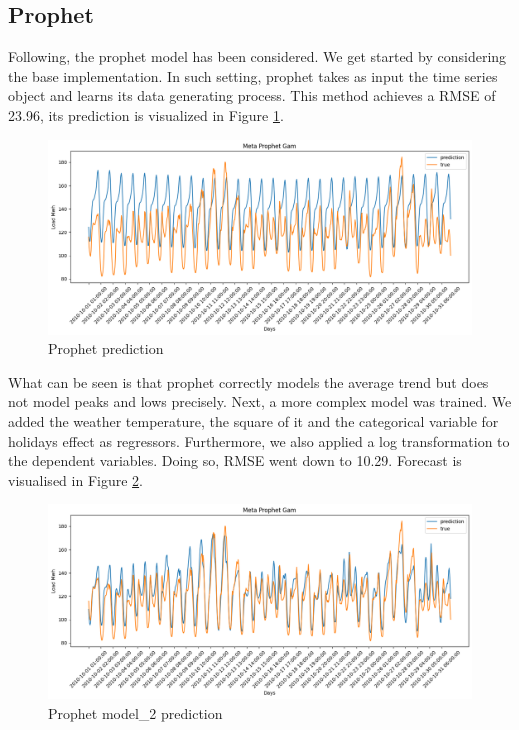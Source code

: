 \subsection{Prophet}
Following, the prophet model has been considered. 
We get started by considering the base implementation. In such setting, prophet takes as input the time series object and learns its data generating process.
This method achieves a RMSE of 23.96, its prediction is visualized in Figure \ref{fig:prophet_price_1}.
\begin{figure}[!h]
    \includegraphics[width=\textwidth]{images/prophet_price_1.png}
    \caption{Prophet prediction}
    \label{fig:prophet_price_1}
\end{figure}
What can be seen is that prophet correctly models the average trend but does not model peaks and lows precisely. 
Next, a more complex model was trained. We added the weather temperature, the square of it and the categorical variable for holidays effect as regressors. Furthermore, we also applied a log transformation to the dependent variables. Doing so, RMSE went down to 10.29. Forecast is visualised in Figure \ref{fig:prophet_price2}.
\begin{figure}[!h]
    \includegraphics[width=\textwidth]{images/prophet_price2.png}
    \caption{Prophet model\_2 prediction}
    \label{fig:prophet_price2}
\end{figure}


